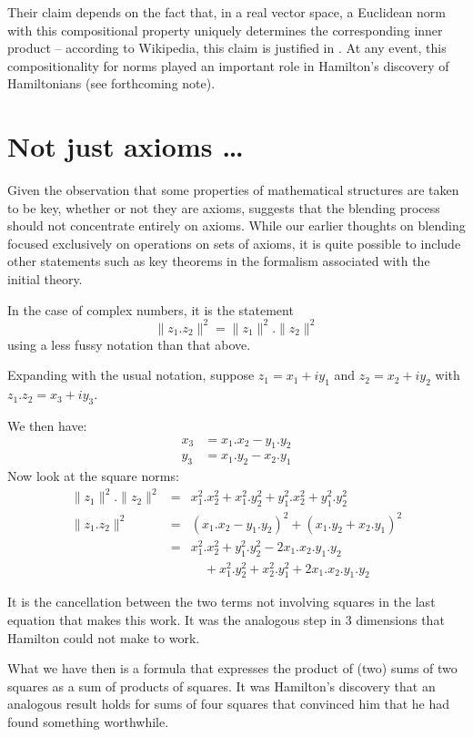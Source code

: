 \documentclass{my-blue-book}
\newcommand{\norm}[1]{\lVert#1\rVert}
\begin{document}
Their claim depends on the fact that, in a real vector space, a Euclidean norm
with this compositional property uniquely determines the corresponding
inner product -- according to Wikipedia, this claim is justified
in \textcite[pp 81--86]{Faraut94}. At any event, this
compositionality for norms played an important role in Hamilton's
discovery of Hamiltonians (see forthcoming note).

\section{Not just axioms \dots}

Given the observation that some properties of mathematical structures
are taken to be key, whether or not they are axioms, suggests
that the blending process should not concentrate entirely on axioms.
While our earlier thoughts on blending focused exclusively on
operations on sets of axioms, it is quite possible to include
other statements such as key theorems in the formalism
associated with the initial theory.

In the case of complex numbers, it is the statement
$$\norm{z_1.z_2}^2 = \norm{z_1}^2.\norm{z_2}^2$$
using a less fussy notation than that above.

Expanding with the usual notation, suppose $z_1 = x_1 + i y_1$
and $z_2 = x_2 + i y_2$ with $z_1.z_2 = x_3 + iy_3$.

We then have:
\begin{eqnarray*}
  x_3 & = x_1.x_2 - y_1.y_2 \\
  y_3 & = x_1.y_2 - x_2.y_1 
\end{eqnarray*}
Now look at the square norms:
\begin{eqnarray*}
  \norm{z_1}^2.\norm{z_2}^2 & = & x_1^2.x_2^2 + x_1^2.y_2^2 + 
                               y_1^2.x_2^2 + y_1^2.y_2^2 \\
 \norm{z_1.z_2}^2  &= &  (x_1.x_2 - y_1.y_2)^2 +  (x_1.y_2 + x_2.y_1)^2 \\
                  &= & x_1^2.x_2^2  + y_1^2.y_2^2 -2 x_1.x_2.y_1.y_2 \\
                  &  &  \quad + x_1^2.y_2^2 + x_2^2.y_1^2 + 2 x_1.x_2.y_1.y_2 
\end{eqnarray*}
                
It is the cancellation between the two terms not involving squares in
the last equation that makes this work. It was the analogous step in
3 dimensions that Hamilton could not make to work.

What we have then is a formula that expresses the product of
(two) sums of two squares as a sum of products of squares.
It was Hamilton's discovery that an analogous result holds
for sums of four squares that convinced him that he had found
something worthwhile.
\end{document}
